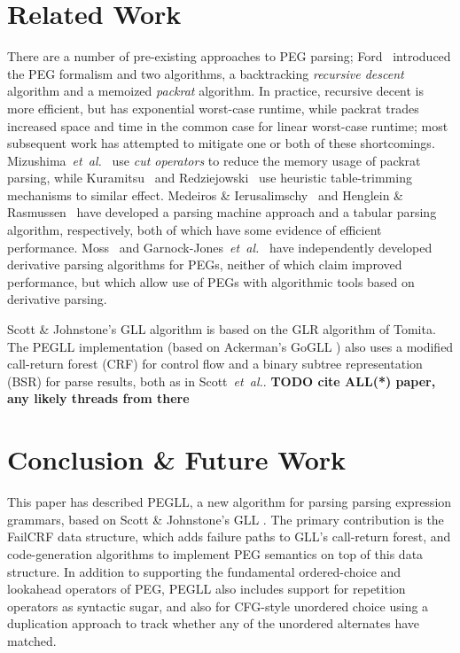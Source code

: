 \documentclass{article}
\makeatletter
\newcommand{\etal}{\textit{et~al.}\@}
\makeatother
\begin{document}
\section{Related Work}
There are a number of pre-existing approaches to PEG parsing; Ford~\cite{For02} introduced the PEG formalism and two algorithms, a backtracking \emph{recursive descent} algorithm and a memoized \emph{packrat} algorithm. 
In practice, recursive decent is more efficient, but has exponential worst-case runtime, while packrat trades increased space and time in the common case for linear worst-case runtime\cite{Mos17}; most subsequent work has attempted to mitigate one or both of these shortcomings. 
Mizushima~\etal~\cite{MMY10} use \emph{cut operators} to reduce the memory usage of packrat parsing, while Kuramitsu~\cite{Kur15} and Redziejowski~\cite{Red07} use heuristic table-trimming mechanisms to similar effect. 
Medeiros \& Ierusalimschy~\cite{MI08} and Henglein \& Rasmussen~\cite{HR17} have developed a parsing machine approach and a tabular parsing algorithm, respectively, both of which have some evidence of efficient performance. 
Moss~\cite{Mos20} and Garnock-Jones~\etal~\cite{GJWE18} have independently developed derivative parsing algorithms for PEGs, neither of which claim improved performance, but which allow use of PEGs with algorithmic tools based on derivative parsing.

Scott \& Johnstone's GLL algorithm \cite{SJ10,SJ16} is based on the GLR algorithm of Tomita\cite{Tom85}. 
The PEGLL implementation (based on Ackerman's GoGLL \cite{Ack19}) also uses a modified call-return forest (CRF) for control flow and a binary subtree representation (BSR) for parse results, both as in Scott~\etal \cite{SJvB19}. \textbf{TODO cite ALL(*) paper, any likely threads from there}

\section{Conclusion \& Future Work}

This paper has described PEGLL, a new algorithm for parsing parsing expression grammars, based on Scott \& Johnstone's GLL \cite{SJ10,SJ16}. 
The primary contribution is the FailCRF data structure, which adds failure paths to GLL's call-return forest, and code-generation algorithms to implement PEG semantics on top of this data structure. 
In addition to supporting the fundamental ordered-choice and lookahead operators of PEG, PEGLL also includes support for repetition operators as syntactic sugar, and also for CFG-style unordered choice using a duplication approach to track whether any of the unordered alternates have matched. 
\end{document}
